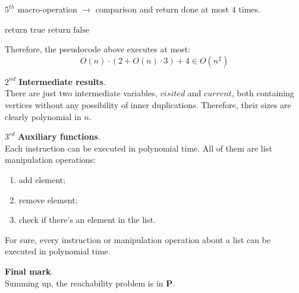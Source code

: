 \begin{example}[title = Decision problem about graphs]
    $5^{th}$ macro-operation $\rightarrow$ comparison and return done at most $4$ times.
    \begin{algorithmic}
            \State $\text{return true}$
        \Else
            \State $\text{return false}$
        \EndIf
    \end{algorithmic}

    Therefore, the pseudocode above executes at most:
    $$ O(n) \cdot (2 + O(n) \cdot 3) + 4 \in O(n^2) $$ 

    $2^{nd}$ \textbf{Intermediate results}. \\
    There are just two intermediate variables, $visited$ and $current$, both containing vertices without any possibility of inner duplications. Therefore, their
    sizes are clearly polynomial in $n$.

    $3^{rd}$ \textbf{Auxiliary functions}. \\
    Each instruction can be executed in polynomial time. All of them are list manipulation operations: \vspace{1.5pt}
    \begin{enumerate}
        \item add element;
        \item remove element;
        \item check if there's an element in the list.
    \end{enumerate}
    For sure, every instruction or manipulation operation about a list can be executed in polynomial time. \vspace{14pt}

    \textbf{Final mark}. \\
    Summing up, the reachability problem is in \textbf{P}.
\end{example} 